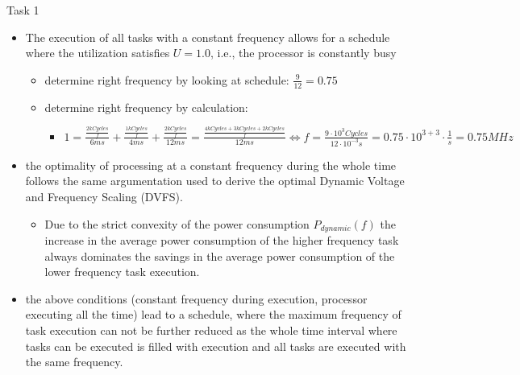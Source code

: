 \begin{frame}[allowframebreaks]{Task 1}{}
\begin{solutionnoinc}
\begin{itemize}
      \item The execution of all tasks with a constant frequency allows for a schedule where the utilization satisfies $U = 1.0$, i.e., the processor is constantly busy
        \begin{itemize}
          \item determine right frequency by looking at schedule: $\frac{9}{12} = 0.75$
          \item determine right frequency by calculation:
            \begin{itemize}
              \item $1 = \frac{\frac{2 kCycles}{f}}{6ms} + \frac{\frac{1 kCycles}{f}}{4ms}  + \frac{\frac{2 kCycles}{f}}{12ms} = \frac{\frac{4 kCycles + 3 kCycles + 2 kCycles}{f}}{12ms} \Leftrightarrow f = \frac{9 \cdot 10^3 Cycles}{12 \cdot 10^{-3} s} = 0.75 \cdot 10^{3 + 3} \cdot \frac{1}{s}  = 0.75MHz$
            \end{itemize}
        \end{itemize}
      \item the optimality of processing at a constant frequency during the whole time follows the same argumentation used to derive the optimal Dynamic Voltage and Frequency Scaling (DVFS).
      \begin{itemize}
        \item Due to the strict convexity of the power consumption $P_{dynamic}(f)$ the increase in the average power consumption of the higher frequency task always dominates the savings in the average power consumption of the lower frequency task execution.
      \end{itemize}
    \end{itemize}
  \end{solutionnoinc}
  \begin{solutionnoinc}
    \small
    \begin{itemize}
      \item the above conditions (constant frequency during execution, processor executing all the time) lead to a schedule, where the maximum frequency of task execution can not be further reduced as the whole time interval where tasks can be executed is filled with execution and all tasks are executed with the same frequency.
    \end{itemize}
  \end{solutionnoinc}
\end{frame}
